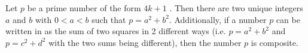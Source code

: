 \documentclass[12pt]{article}
\begin{document}
Let $p$ be a prime number of the form $4k+1$ . Then there are two unique integers $a$ and $b$ with $0<a<b$ such that $p=a^2+b^2$.  Additionally, if a number $p$ can be written in as the sum of two squares in 2 different ways (i.e. $p=a^2+b^2$ and $p=c^2+d^2$ with the two sums being different), then the number $p$ is composite.
\end{document}
